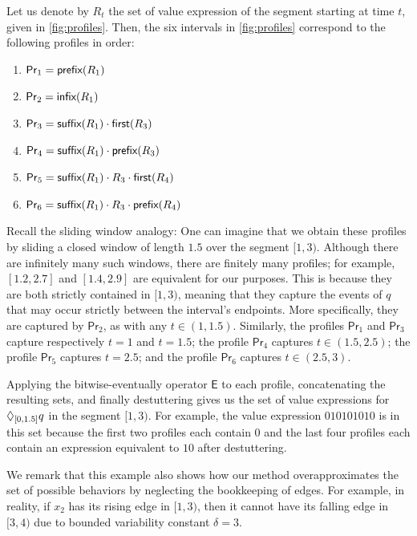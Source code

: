 \begin{example}
	Let us denote by $R_t$ the set of value expression of the segment starting at time $t$, given in \cref{fig:profiles}.
	Then, the six intervals in \cref{fig:profiles} correspond to the following profiles in order:
	\begin{enumerate}
		\item $\mathsf{Pr}_1 = \textsf{prefix}(R_1)$
		\item $\mathsf{Pr}_2 = \textsf{infix}(R_1)$
		\item $\mathsf{Pr}_3 = \textsf{suffix}(R_1) \cdot \textsf{first}(R_3)$
		\item $\mathsf{Pr}_4 = \textsf{suffix}(R_1) \cdot \textsf{prefix}(R_3)$
		\item $\mathsf{Pr}_5 = \textsf{suffix}(R_1) \cdot R_3 \cdot \textsf{first}(R_4)$
		\item $\mathsf{Pr}_6 = \textsf{suffix}(R_1) \cdot R_3 \cdot \textsf{prefix}(R_4)$
	\end{enumerate}
	Recall the sliding window analogy:
	One can imagine that we obtain these profiles by sliding a closed window of length $1.5$ over the segment $[1,3)$.
	Although there are infinitely many such windows, there are finitely many profiles; for example, $[1.2,2.7]$ and $[1.4,2.9]$ are equivalent for our purposes.
	This is because they are both strictly contained in $[1,3)$, meaning that they capture the events of $q$ that may occur strictly between the interval's endpoints.
	More specifically, they are captured by $\mathsf{Pr}_2$, as with any $t \in (1,1.5)$.
	Similarly, the profiles $\mathsf{Pr}_1$ and $\mathsf{Pr}_3$ capture respectively $t = 1$ and $t = 1.5$; the profile $\mathsf{Pr}_4$ captures $t \in (1.5,2.5)$; the profile $\mathsf{Pr}_5$ captures $t = 2.5$; and the profile $\mathsf{Pr}_6$ captures $t \in (2.5,3)$.   
	
	Applying the bitwise-eventually operator $\mathsf{E}$ to each profile, concatenating the resulting sets, and finally destuttering gives us the set of value expressions for $\lozenge_{[0,1.5]} q$ in the segment $[1,3)$.
	For example, the value expression $0 10 10 10 10$ is in this set because the first two profiles each contain $0$ and the last four profiles each contain an expression equivalent to $10$ after destuttering.
	
	We remark that this example also shows how our method overapproximates the set of possible behaviors by neglecting the bookkeeping of edges.
	For example, in reality, if $x_2$ has its rising edge in $[1,3)$, then it cannot have its falling edge in $[3,4)$ due to bounded variability constant $\delta = 3$.
\end{example}

